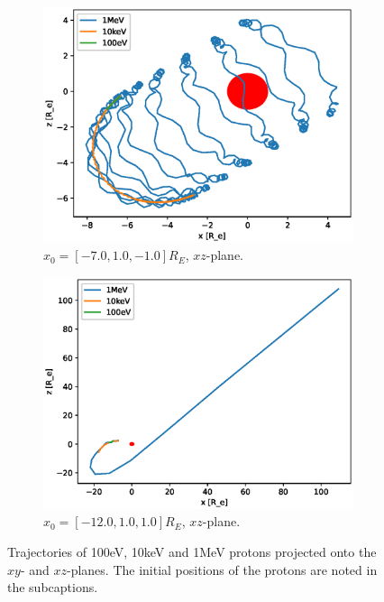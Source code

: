 \begin{figure}
\begin{subfigure}[h]{0.45\textwidth}
        \includegraphics[width=\textwidth]{Figures/Trajectories/trajectories-xz-71.eps}
        \caption{$x_0 = [-7.0,1.0,-1.0]R_E$, $xz$-plane.}
        \label{fig:traj-g}
    \end{subfigure}
    \hfill
    \begin{subfigure}[h]{0.45\textwidth}
        \includegraphics[width=\textwidth]{Figures/Trajectories/trajectories-xz-98.eps}
        \caption{$x_0 = [-12.0,1.0,1.0]R_E$, $xz$-plane.}
        \label{fig:traj-h}
    \end{subfigure}
    \caption{Trajectories of 100eV, 10keV and 1MeV protons projected onto the $xy$- and 
    $xz$-planes. The initial positions of the protons are noted in the subcaptions.}
    \label{fig:trajectories}
\end{figure}